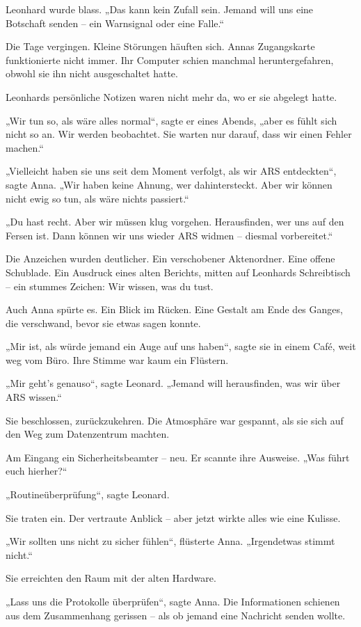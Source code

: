 \documentclass[
]{article}
\begin{document}
Leonhard wurde blass. „Das kann kein Zufall sein. Jemand will uns eine Botschaft senden -- ein Warnsignal oder eine Falle.``

Die Tage vergingen. Kleine Störungen häuften sich. Annas Zugangskarte funktionierte nicht immer. Ihr Computer schien manchmal heruntergefahren, obwohl sie ihn nicht ausgeschaltet hatte.

Leonhards persönliche Notizen waren nicht mehr da, wo er sie abgelegt hatte.

„Wir tun so, als wäre alles normal``, sagte er eines Abends, „aber es fühlt sich nicht so an. Wir werden beobachtet. Sie warten nur darauf, dass wir einen Fehler machen.``

„Vielleicht haben sie uns seit dem Moment verfolgt, als wir ARS entdeckten``, sagte Anna. „Wir haben keine Ahnung, wer dahintersteckt. Aber wir können nicht ewig so tun, als wäre nichts passiert.``

„Du hast recht. Aber wir müssen klug vorgehen. Herausfinden, wer uns auf den Fersen ist. Dann können wir uns wieder ARS widmen -- diesmal vorbereitet.``

Die Anzeichen wurden deutlicher. Ein verschobener Aktenordner. Eine offene Schublade. Ein Ausdruck eines alten Berichts, mitten auf Leonhards Schreibtisch -- ein stummes Zeichen: Wir wissen, was du tust.

Auch Anna spürte es. Ein Blick im Rücken. Eine Gestalt am Ende des Ganges, die verschwand, bevor sie etwas sagen konnte.

„Mir ist, als würde jemand ein Auge auf uns haben``, sagte sie in einem Café, weit weg vom Büro. Ihre Stimme war kaum ein Flüstern.

„Mir geht's genauso``, sagte Leonard. „Jemand will herausfinden, was wir über ARS wissen.``

Sie beschlossen, zurückzukehren. Die Atmosphäre war gespannt, als sie sich auf den Weg zum Datenzentrum machten.

Am Eingang ein Sicherheitsbeamter -- neu. Er scannte ihre Ausweise. „Was führt euch hierher?{\kern0pt}``

„Routineüberprüfung``, sagte Leonard.

Sie traten ein. Der vertraute Anblick -- aber jetzt wirkte alles wie eine Kulisse.

„Wir sollten uns nicht zu sicher fühlen``, flüsterte Anna. „Irgendetwas stimmt nicht.``

Sie erreichten den Raum mit der alten Hardware.

„Lass uns die Protokolle überprüfen``, sagte Anna. Die Informationen schienen aus dem Zusammenhang gerissen -- als ob jemand eine Nachricht senden wollte.
\end{document}
